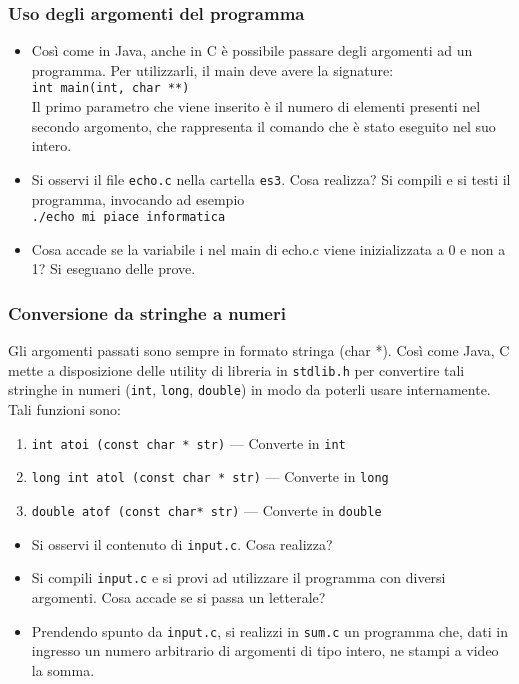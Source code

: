 \documentclass{beamer}
\begin{document}
\begin{frame}[fragile]
\frametitle{Uso degli argomenti del programma}
\begin{itemize}
 \item Così come in Java, anche in C è possibile passare degli argomenti ad un programma. Per utilizzarli, il main deve avere la signature: \\ \texttt{int main(int, char **)}\\ Il primo parametro che viene inserito è il numero di elementi presenti nel secondo argomento, che rappresenta il comando che è stato eseguito nel suo intero.
 \item Si osservi il file \texttt{echo.c} nella cartella \texttt{es3}. Cosa realizza? Si compili e si testi il programma, invocando ad esempio \\\texttt{./echo mi piace informatica}
 \item Cosa accade se la variabile i nel main di echo.c viene inizializzata a 0 e non a 1? Si eseguano delle prove.
\end{itemize}
\end{frame}

\begin{frame}[fragile]
\frametitle{Conversione da stringhe a numeri}
Gli argomenti passati sono sempre in formato stringa (char *). Così come Java, C mette a disposizione delle utility di libreria in \texttt{stdlib.h} per convertire tali stringhe in numeri (\texttt{int}, \texttt{long}, \texttt{double}) in modo da poterli usare internamente. Tali funzioni sono:
\begin{enumerate}
 \item \texttt{int atoi (const char * str)} --- Converte in \texttt{int}
 \item \texttt{long int atol (const char * str)} --- Converte in \texttt{long}
 \item \texttt{double atof (const char* str)} --- Converte in \texttt{double}
\end{enumerate}
\begin{itemize}
 \item Si osservi il contenuto di \texttt{input.c}. Cosa realizza?
 \item Si compili \texttt{input.c} e si provi ad utilizzare il programma con diversi argomenti. Cosa accade se si passa un letterale?
 \item Prendendo spunto da \texttt{input.c}, si realizzi in \texttt{sum.c} un programma che, dati in ingresso un numero arbitrario di argomenti di tipo intero, ne stampi a video la somma.
\end{itemize}
\end{frame}
\end{document}
